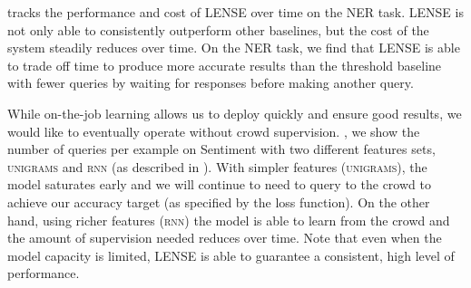  tracks the performance and cost of LENSE over time on the NER task.
LENSE is not only able to consistently outperform other baselines, but the cost of the system steadily reduces over time.
On the NER task, we find that LENSE is able to trade off time to produce more accurate results than the threshold baseline with fewer queries by waiting for responses before making another query.




While on-the-job learning allows us to deploy quickly and ensure good results, we would like to eventually operate without crowd supervision.
, we show the number of queries per example on Sentiment with two different features sets, \textsc{unigrams} and \textsc{rnn} (as described in ).
With simpler features (\textsc{unigrams}),
the model saturates early and we will continue to need to query to the crowd to achieve our accuracy target (as specified by the loss function).
On the other hand, using richer features (\textsc{rnn}) the model is able to learn from the crowd and the amount of supervision needed reduces over time.
Note that even when the model capacity is limited, LENSE is able to guarantee a consistent, high level of performance.

